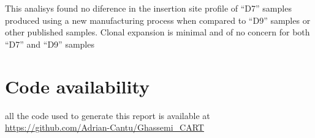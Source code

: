 \documentclass[]{article}
\begin{document}
This analisys found no diference in the insertion site profile of ``D7''
samples produced using a new manufacturing process when compared to
``D9'' samples or other published samples. Clonal expansion is minimal
and of no concern for both ``D7'' and ``D9'' samples

\hypertarget{code-availability}{%
\section{Code availability}\label{code-availability}}

all the code used to generate this report is available at
\url{https://github.com/Adrian-Cantu/Ghassemi_CART}




\newpage
\singlespacing 

\end{document}
